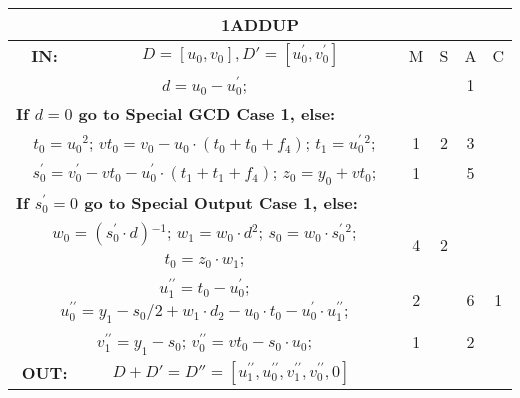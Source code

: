\begin{tabular}{|c|cr|c|c|c|c|}
\hline
\multicolumn{7}{|c|}{\bf{1ADDUP}} \TS \\
\hline
\bf{IN:} &\multicolumn{2}{|c|}{$D = [u_0,v_0], D' = [u^{\prime}_0,v^{\prime}_0]$}
\TS & M & \hspace{1pt}S\hspace{1pt} & A & \hspace{1pt}C\hspace{1pt} \\
\hline
\multicolumn{3}{|R{340pt}|}{ 
$d=u_0-u^{\prime}_0$;\hspace{4pt}
} &  &  & 1 & \\
\multicolumn{3}{|l|}{ 
 \bf{If $d = 0$ go to Special GCD Case 1, else:} } &  &  &  & \\
\multicolumn{3}{|R{340pt}|}{ 
$t_0=u_0{}^{2}$;\hspace{4pt}
$vt_0=v_0-u_0 \cdot (t_0+t_0+f_4)$;\hspace{4pt}
$t_1=u^{\prime}_0{}^{2}$;\hspace{4pt}
} & 1 & 2 & 3 & \\
\multicolumn{3}{|R{340pt}|}{ 
$s^{\prime}_0=v^{\prime}_0-vt_0-u^{\prime}_0 \cdot (t_1+t_1+f_4)$;\hspace{4pt}
$z_0=y_0+vt_0$;\hspace{4pt}
} & 1 &  & 5 & \\
\multicolumn{3}{|l|}{ 
 \bf{If $s^{\prime}_0 = 0$ go to Special Output Case 1, else:} } &  &  &  & \\
\multicolumn{3}{|R{340pt}|}{ 
$w_0=(s^{\prime}_0 \cdot d){}^{-1}$;\hspace{4pt}
$w_1=w_0 \cdot d{}^{2}$;\hspace{4pt}
$s_0=w_0 \cdot s^{\prime}_0{}^{2}$;\hspace{4pt}
$t_0=z_0 \cdot w_1$;\hspace{4pt}
} & 4 & 2 &  & \\
\multicolumn{3}{|R{340pt}|}{ 
$u^{\prime\prime}_1=t_0-u^{\prime}_0$;\hspace{4pt}
$u^{\prime\prime}_0=y_1-s_0/2+w_1 \cdot d_2-u_0 \cdot t_0-u^{\prime}_0 \cdot u^{\prime\prime}_1$;\hspace{4pt}
} & 2 &  & 6 & 1\\
\multicolumn{3}{|R{340pt}|}{ 
$v^{\prime\prime}_1=y_1-s_0$;\hspace{4pt}
$v^{\prime\prime}_0=vt_0-s_0 \cdot u_0$;\hspace{4pt}
} & 1 &  & 2 & \\
\hline
\bf{OUT:} & \hspace*{65pt} $D + D' = D'' = [u^{\prime\prime}_1,u^{\prime\prime}_0,v^{\prime\prime}_1,v^{\prime\prime}_0,0]$

\end{tabular}
